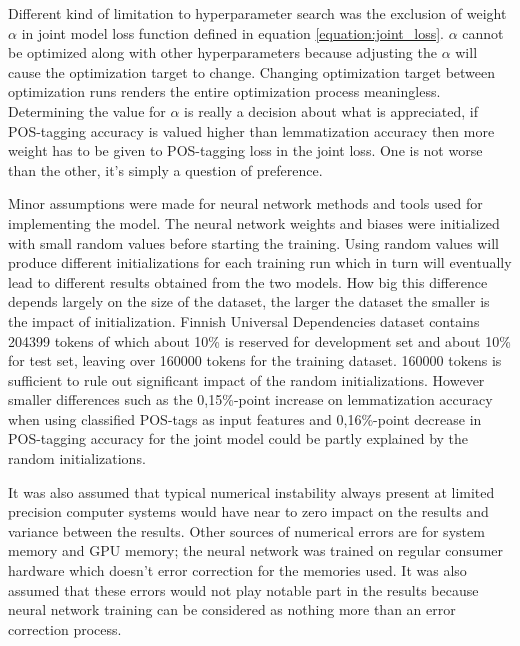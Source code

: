 \documentclass[12pt,a4paper,english
]{tutthesis}
\begin{document}
Different kind of limitation to hyperparameter search was the exclusion of weight $\alpha$ in joint model loss function defined in equation \ref{equation:joint_loss}. $\alpha$ cannot be optimized along with other hyperparameters because adjusting the $\alpha$ will cause the optimization target to change. Changing optimization target between optimization runs renders the entire optimization process meaningless. Determining the value for $\alpha$ is really a decision about what is appreciated, if POS-tagging accuracy is valued higher than lemmatization accuracy then more weight has to be given to POS-tagging loss in the joint loss. One is not worse than the other, it's simply a question of preference.

Minor assumptions were made for neural network methods and tools used for implementing the model. The neural network weights and biases were initialized with small random values before starting the training. Using random values will produce different initializations for each training run which in turn will eventually lead to different results obtained from the two models. How big this difference depends largely on the size of the dataset, the larger the dataset the smaller is the impact of initialization. Finnish Universal Dependencies dataset contains 204399 tokens of which about 10\% is reserved for development set and about 10\% for test set, leaving over 160000 tokens for the training dataset. 160000 tokens is sufficient to rule out significant impact of the random initializations. However smaller differences such as the 0,15\%-point increase on lemmatization accuracy when using classified POS-tags as input features and 0,16\%-point decrease in POS-tagging accuracy for the joint model could be partly explained by the random initializations.

It was also assumed that typical numerical instability always present at limited precision computer systems would have near to zero impact on the results and variance between the results. Other sources of numerical errors are for system memory and GPU memory; the neural network was trained on regular consumer hardware which doesn't error correction for the memories used. It was also assumed that these errors would not play notable part in the results because neural network training can be considered as nothing more than an error correction process.
\end{document}
